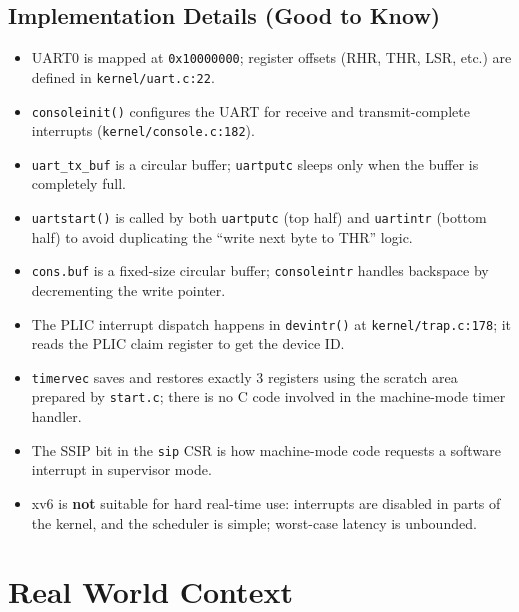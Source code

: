 \documentclass[11pt, a4paper]{article}
\begin{document}
\subsection{Implementation Details (Good to Know)}

\begin{tcolorbox}[impldetail]
\begin{itemize}[leftmargin=1.5em, itemsep=0.2em]
  \item UART0 is mapped at \lstinline|0x10000000|; register offsets (RHR, THR, LSR, etc.) are defined in \lstinline|kernel/uart.c:22|.
  \item \lstinline|consoleinit()| configures the UART for receive and transmit-complete interrupts (\lstinline|kernel/console.c:182|).
  \item \lstinline|uart_tx_buf| is a circular buffer; \lstinline|uartputc| sleeps only when the buffer is completely full.
  \item \lstinline|uartstart()| is called by both \lstinline|uartputc| (top half) and \lstinline|uartintr| (bottom half) to avoid duplicating the ``write next byte to THR'' logic.
  \item \lstinline|cons.buf| is a fixed-size circular buffer; \lstinline|consoleintr| handles backspace by decrementing the write pointer.
  \item The PLIC interrupt dispatch happens in \lstinline|devintr()| at \lstinline|kernel/trap.c:178|; it reads the PLIC claim register to get the device ID.
  \item \lstinline|timervec| saves and restores exactly 3 registers using the scratch area prepared by \lstinline|start.c|; there is no C code involved in the machine-mode timer handler.
  \item The SSIP bit in the \lstinline|sip| CSR is how machine-mode code requests a software interrupt in supervisor mode.
  \item xv6 is \textbf{not} suitable for hard real-time use: interrupts are disabled in parts of the kernel, and the scheduler is simple; worst-case latency is unbounded.
\end{itemize}
\end{tcolorbox}

\section{Real World Context}
\end{document}
